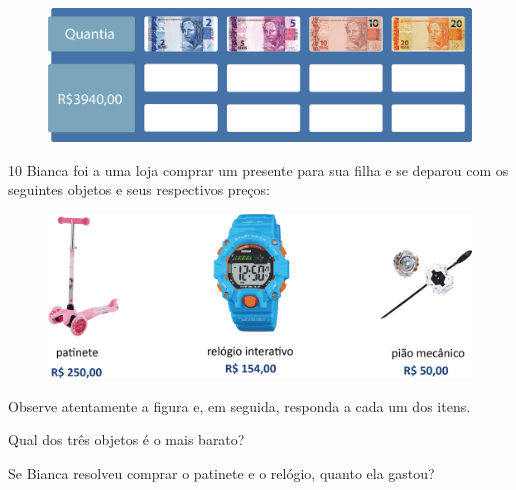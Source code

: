 \begin{figure}[htpb!]
\centering
\includegraphics[width=\textwidth]{./media/image70.png}
\end{figure}


\pagebreak
\num{10} Bianca foi a uma loja comprar um presente para sua filha e se deparou
com os seguintes objetos e seus respectivos preços:

\begin{figure}[htpb!]
\centering
\includegraphics[width=\textwidth]{./media/image72.png}
\end{figure}

Observe atentamente a figura e, em seguida, responda a cada um dos itens.

\begin{escolha}
\item Qual dos três objetos é o mais barato?


\item Se Bianca resolveu comprar o patinete e o relógio, quanto ela gastou?

\end{escolha}

